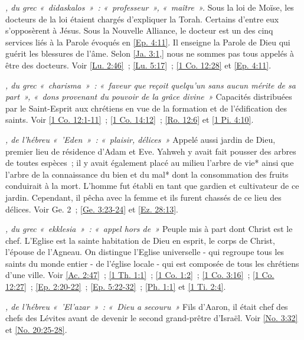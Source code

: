\begin{multicols}{2}
\textit{, du grec «~didaskalos~»~: «~professeur~», «~maître~».}\newline
Sous la loi de Moïse, les docteurs de la loi étaient chargés d'expliquer la Torah. Certains d'entre eux s'opposèrent à Jésus. Sous la Nouvelle Alliance, le docteur est un des cinq services liés à la Parole évoqués en \vref{Ep. 4:11}. Il enseigne la Parole de Dieu qui guérit les blessures de l'âme. Selon \vref{Ja. 3:1,} nous ne sommes pas tous appelés à être des docteurs. Voir \vref{Lu. 2:46}~; \vref{Lu. 5:17}~; \vref{1 Co. 12:28} et \vref{Ep. 4:11}.

\textit{, du grec «~charisma~»~: «~faveur que reçoit quelqu'un sans aucun mérite de sa part~», «~dons provenant du pouvoir de la grâce divine~»}\newline
Capacités distribuées par le Saint-Esprit aux chrétiens en vue de la formation et de l'édification des saints. Voir \vref{1 Co. 12:1-11}~; \vref{1 Co. 14:12}~; \vref{Ro. 12:6} et \vref{1 Pi. 4:10}.

\textit{, de l'hébreu «~'Eden~»~: «~plaisir, délices~»}\newline
Appelé aussi jardin de Dieu, premier lieu de résidence d'Adam et Eve. Yahweh y avait fait pousser des arbres de toutes espèces~; il y avait également placé au milieu l'arbre de vie* ainsi que l'arbre de la connaissance du bien et du mal* dont la consommation des fruits conduirait à la mort. L'homme fut établi en tant que gardien et cultivateur de ce jardin. Cependant, il pêcha avec la femme et ils furent chassés de ce lieu des délices. Voir Ge. 2~; \vref{Ge. 3:23-24} et \vref{Ez. 28:13}.

\textit{, du grec «~ekklesia~»~: «~appel hors de~»}\newline
Peuple mis à part dont Christ est le chef. L'Eglise est la sainte habitation de Dieu en esprit, le corps de Christ, l'épouse de l'Agneau. On distingue l'Eglise universelle - qui regroupe tous les saints du monde entier - de l'église locale - qui est composée de tous les chrétiens d'une ville. Voir \vref{Ac. 2:47}~; \vref{1 Th. 1:1}~; \vref{1 Co. 1:2}~; \vref{1 Co. 3:16}~; \vref{1 Co. 12:27}~; \vref{Ep. 2:20-22}~; \vref{Ep. 5:22-32}~; \vref{Ph. 1:1} et \vref{1 Ti. 2:4}.

\textit{, de l'hébreu «~'El'azar~»~: «~Dieu a secouru~»}\newline
Fils d'Aaron, il était chef des chefs des Lévites avant de devenir le second grand-prêtre d'Israël. Voir \vref{No. 3:32} et \vref{No. 20:25-28}.


\end{multicols}
